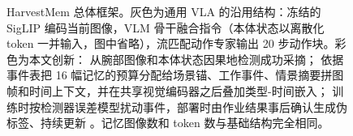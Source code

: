\begin{figure}[t]
{}
\caption{HarvestMem 总体框架。灰色为通用 VLA 的沿用结构：冻结的 SigLIP 编码当前图像，VLM 骨干融合指令（本体状态以离散化 token 一并输入，图中省略），流匹配动作专家输出 20 步动作块。彩色为本文创新：\Ci{} \pedet{} 从腕部图像和本体状态因果地检测成功采摘；\Cii{} \hem{} 依据事件表把 16 幅记忆的预算分配给场景锚、工作事件、情景摘要拼图帧和时间上下文，并在共享视觉编码器之后叠加类型-时间嵌入；\Ciii{} 训练时按检测器误差模型扰动事件，部署时由作业结果事后确认生成伪标签、持续更新 \pedet。记忆图像数和 token 数与基础结构完全相同。}
\label{fig:overview}
\end{figure}
